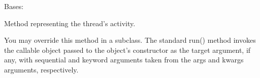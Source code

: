 \documentclass[letterpaper,10pt,english]{sphinxmanual}
\begin{document}

\begin{fulllineitems}
\label{\detokenize{pgamit.classes:pgamit.classes.pyRunWithRetry.command}}
\pysigstartsignatures
\pysiglinewithargsret
{}
{\sphinxparamcomma {}\sphinxparamcomma {}}
{}
\pysigstopsignatures
\sphinxAtStartPar
Bases: 

\begin{fulllineitems}
\label{\detokenize{pgamit.classes:pgamit.classes.pyRunWithRetry.command.run}}
\pysigstartsignatures
\pysiglinewithargsret
{}
{}
{}
\pysigstopsignatures
\sphinxAtStartPar
Method representing the thread’s activity.

\sphinxAtStartPar
You may override this method in a subclass. The standard run() method
invokes the callable object passed to the object’s constructor as the
target argument, if any, with sequential and keyword arguments taken
from the args and kwargs arguments, respectively.

\end{fulllineitems}


\begin{fulllineitems}
\label{\detokenize{pgamit.classes:pgamit.classes.pyRunWithRetry.command.wait}}
\pysigstartsignatures
\pysiglinewithargsret
{}
{}
{}
\pysigstopsignatures
\end{fulllineitems}


\end{fulllineitems}
\end{document}
